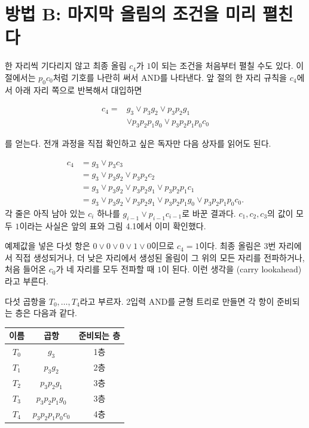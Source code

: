 \section{방법 B: 마지막 올림의 조건을 미리 펼친다}

한 자리씩 기다리지 않고 최종 올림 \(c_4\)가 \(1\)이 되는 조건을 처음부터 펼칠 수도 있다. 이 절에서는 \(p_0c_0\)처럼 기호를 나란히 써서 AND를 나타낸다. 앞 절의 한 자리 규칙을 \(c_4\)에서 아래 자리 쪽으로 반복해서 대입하면

\[
\begin{aligned}
  c_4={}&g_3
  \lor p_3g_2
  \lor p_3p_2g_1\\
  &\lor p_3p_2p_1g_0
  \lor p_3p_2p_1p_0c_0
\end{aligned}
\]

를 얻는다. 전개 과정을 직접 확인하고 싶은 독자만 다음 상자를 읽어도 된다.

\begin{infobox}[선택 읽기: \(c_4\) 식이 자라는 과정]
\[
\begin{aligned}
  c_4
  &=g_3\lor p_3c_3\\
  &=g_3\lor p_3g_2\lor p_3p_2c_2\\
  &=g_3\lor p_3g_2\lor p_3p_2g_1\lor p_3p_2p_1c_1\\
  &=g_3\lor p_3g_2\lor p_3p_2g_1
    \lor p_3p_2p_1g_0\lor p_3p_2p_1p_0c_0.
\end{aligned}
\]
각 줄은 아직 남아 있는 \(c_i\) 하나를 \(g_{i-1}\lor p_{i-1}c_{i-1}\)로 바꾼 결과다. \(c_1,c_2,c_3\)의 값이 모두 \(1\)이라는 사실은 앞의 표와 그림 4.1에서 이미 확인했다.
\end{infobox}

예제값을 넣은 다섯 항은 \(0\lor0\lor0\lor1\lor0\)이므로 \(c_4=1\)이다. 최종 올림은 3번 자리에서 직접 생성되거나, 더 낮은 자리에서 생성된 올림이 그 위의 모든 자리를 전파하거나, 처음 들어온 \(c_0\)가 네 자리를 모두 전파할 때 \(1\)이 된다. 이런 생각을 (carry lookahead)라고 부른다\parencite{mit6111arithmetic,mit6896fastaddition}.

다섯 곱항을 \(T_0,\ldots,T_4\)라고 부르자. 2입력 AND를 균형 트리로 만들면 각 항이 준비되는 층은 다음과 같다.

\begin{center}
\small
\begin{tabular}{ccc}
\toprule
\sffamily\bfseries 이름 & \sffamily\bfseries 곱항 & \sffamily\bfseries 준비되는 층 \\
\midrule
\(T_0\) & \(g_3\) & 1층 \\
\(T_1\) & \(p_3g_2\) & 2층 \\
\(T_2\) & \(p_3p_2g_1\) & 3층 \\
\(T_3\) & \(p_3p_2p_1g_0\) & 3층 \\
\(T_4\) & \(p_3p_2p_1p_0c_0\) & 4층 \\
\bottomrule
\end{tabular}
\end{center}

